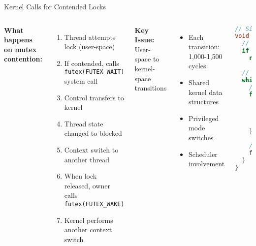 \documentclass{beamer}
\begin{document}
\begin{frame}[fragile]{Kernel Calls for Contended Locks}
\begin{columns}
\textbf{What happens on mutex contention:}
\begin{enumerate}
    \item Thread attempts lock (user-space)
    \item If contended, calls \texttt{futex(FUTEX\_WAIT)} system call
    \item Control transfers to kernel
    \item Thread state changed to blocked
    \item Context switch to another thread
    \item When lock released, owner calls \texttt{futex(FUTEX\_WAKE)}
    \item Kernel performs another context switch
\end{enumerate}

\textbf{Key Issue:} User-space to kernel-space transitions
\begin{itemize}
    \item Each transition: 1,000-1,500 cycles
    \item Shared kernel data structures
    \item Privileged mode switches
    \item Scheduler involvement
\end{itemize}

\begin{lstlisting}[language=C++, basicstyle=\tiny]
// Simplified pthread_mutex implementation
void lock_mutex(pthread_mutex_t* m) {
  // Fast path - try atomic acquisition
  if (atomic_cas(&m->locked, 0, 1) == 0)
    return; // Got the lock!
    
  // Slow path - contention
  while (1) {
    // Spin a bit first (optimistic)
    for (int i = 0; i < 100; i++) {
      if (m->locked == 0 &&
          atomic_cas(&m->locked, 0, 1) == 0)
        return;
      _mm_pause(); // CPU hint
    }
        
    // Enter kernel (expensive!)
    futex(&m->locked, FUTEX_WAIT, 1, NULL);
  }
}
\end{lstlisting}
\end{columns}
\end{frame}
\end{document}
